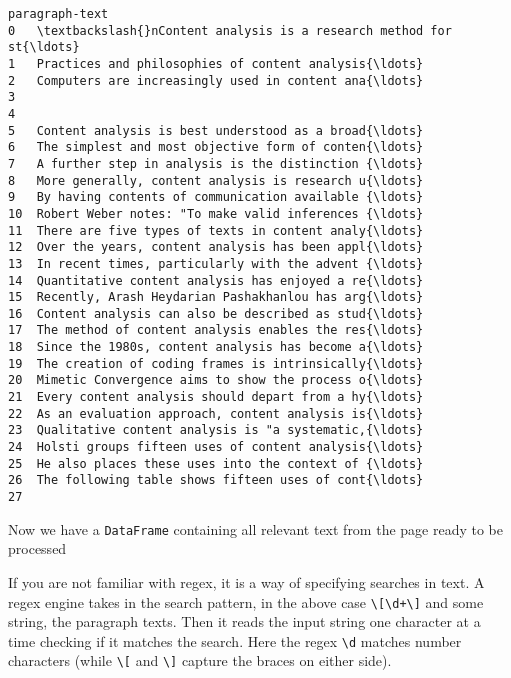 \documentclass[11pt]{article}
\begin{document}
    \begin{Verbatim}[commandchars=\\\{\}]
                                       paragraph-text
0   \textbackslash{}nContent analysis is a research method for st{\ldots}
1   Practices and philosophies of content analysis{\ldots}
2   Computers are increasingly used in content ana{\ldots}
3                                                    
4                                                    
5   Content analysis is best understood as a broad{\ldots}
6   The simplest and most objective form of conten{\ldots}
7   A further step in analysis is the distinction {\ldots}
8   More generally, content analysis is research u{\ldots}
9   By having contents of communication available {\ldots}
10  Robert Weber notes: "To make valid inferences {\ldots}
11  There are five types of texts in content analy{\ldots}
12  Over the years, content analysis has been appl{\ldots}
13  In recent times, particularly with the advent {\ldots}
14  Quantitative content analysis has enjoyed a re{\ldots}
15  Recently, Arash Heydarian Pashakhanlou has arg{\ldots}
16  Content analysis can also be described as stud{\ldots}
17  The method of content analysis enables the res{\ldots}
18  Since the 1980s, content analysis has become a{\ldots}
19  The creation of coding frames is intrinsically{\ldots}
20  Mimetic Convergence aims to show the process o{\ldots}
21  Every content analysis should depart from a hy{\ldots}
22  As an evaluation approach, content analysis is{\ldots}
23  Qualitative content analysis is "a systematic,{\ldots}
24  Holsti groups fifteen uses of content analysis{\ldots}
25  He also places these uses into the context of {\ldots}
26  The following table shows fifteen uses of cont{\ldots}
27                                                   

    \end{Verbatim}

    Now we have a \texttt{DataFrame} containing all relevant text from the
page ready to be processed

If you are not familiar with regex, it is a way of specifying searches
in text. A regex engine takes in the search pattern, in the above case
\texttt{\textquotesingle{}\textbackslash{}{[}\textbackslash{}d+\textbackslash{}{]}\textquotesingle{}}
and some string, the paragraph texts. Then it reads the input string one
character at a time checking if it matches the search. Here the regex
\texttt{\textquotesingle{}\textbackslash{}d\textquotesingle{}} matches
number characters (while
\texttt{\textquotesingle{}\textbackslash{}{[}\textquotesingle{}} and
\texttt{\textquotesingle{}\textbackslash{}{]}\textquotesingle{}} capture
the braces on either side).
\end{document}
